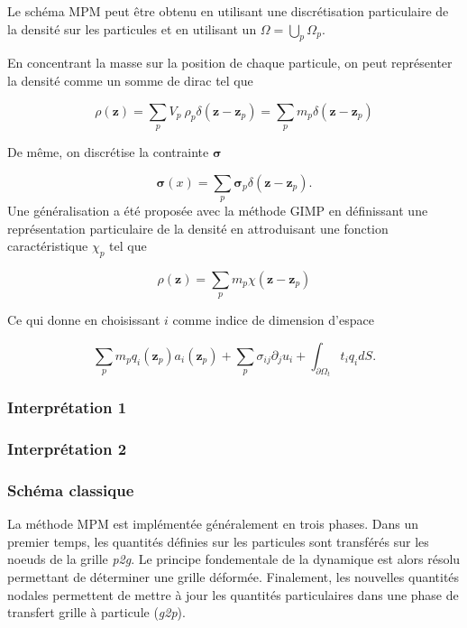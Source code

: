 Le schéma MPM peut être obtenu en utilisant une discrétisation particulaire de la densité sur les particules et en utilisant un  $\Omega = \bigcup_p \Omega_p$.

En concentrant la masse sur la position de chaque particule, on peut représenter la densité comme un somme de dirac tel que

\begin{equation*}
    \rho(\bm z) = \sum_p V_p~\rho_p \delta(\bm z - \bm z_p) = \sum_p m_p \delta(\bm z - \bm z_p)
\end{equation*}

De même, on discrétise la contrainte $\bm \sigma$

\begin{equation*}
    \bm \sigma(x) = \sum_p \bm \sigma_p \delta(\bm z - \bm z_p).
\end{equation*}
Une généralisation a été proposée avec la méthode GIMP \cite{bardenhagen_generalized_2004} en définissant une représentation particulaire de la densité en attroduisant une fonction caractéristique $\chi_p$ tel que

\begin{equation*}
    \rho(\bm z) = \sum_p m_p \chi(\bm z - \bm z_p)
\end{equation*}

Ce qui donne en choisissant $i$ comme indice de dimension d'espace

\begin{equation*}
    \sum_p m_p q_i(\bm z_p) a_i(\bm z_p) + \sum_p \sigma_{ij} \partial_j u_i + \int_{\partial \Omega_t} t_i q_i dS.
\end{equation*}




\subsubsection{Interprétation 1}


\subsubsection{Interprétation 2}

\subsubsection{Schéma classique}

La méthode MPM est implémentée généralement en trois phases. Dans un premier temps, les quantités définies sur les particules sont transférés sur les noeuds de la grille \textit{p2g}. Le principe fondementale de la dynamique est alors résolu permettant de déterminer une grille déformée. Finalement, les nouvelles quantités nodales permettent de mettre à jour les quantités particulaires dans une phase de transfert grille à particule (\textit{g2p}).

